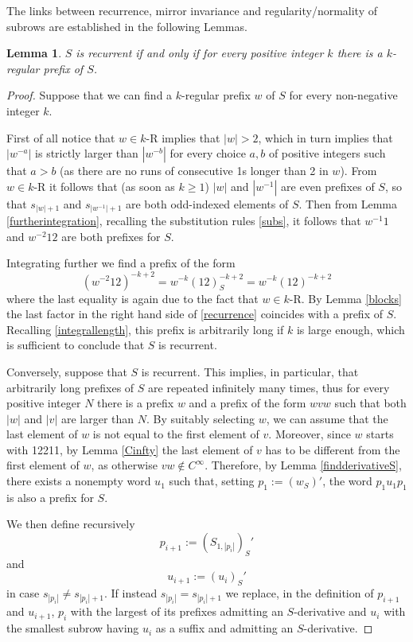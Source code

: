 \documentclass[10pt,a4paper]{article}
\newtheorem{lemma}{Lemma}
\begin{document}
The links between recurrence, mirror invariance and regularity/normality of subrows  are established in the following Lemmas. 


\begin{lemma}
$S$ is recurrent if and only if for every positive integer $k$ there is a $k$-regular prefix of $S$.
\label{recur}
\end{lemma}
\begin{proof}
Suppose that we can find a $k$-regular prefix $w$ of $S$ for every non-negative integer $k$. 


First of all notice that $w\in k$-R implies that $|w|>2$, which in turn implies that $|w^{-a}|$ is strictly larger than $|w^{-b}|$ for every choice $a,b$ of positive integers such that $a>b$ (as there are no runs of consecutive 1s longer than 2 in $w$). 
From $w\in k$-R it follows that (as soon as $k \ge 1$) $|w|$ and $|w^{-1}|$ are even prefixes of $S$, so that $s_{|w|+1}$ and $s_{|w^{-1}|+1}$ are both odd-indexed elements of $S$. Then from Lemma \ref{furtherintegration}, recalling the substitution rules \eqref{subs}, it follows that  $w^{-1}1$ and $w^{-2}12$ are both prefixes for $S$. 
 
Integrating further we find a prefix of the form
\begin{equation}
(w^{-2}12)^{-k+2}=w^{-k}(12)_S^{-k+2}=w^{-k}(12)^{-k+2}
\label{recurrence}
\end{equation}
where the last equality is again due to the fact that $w\in k$-R.
By Lemma \ref{blocks} the last factor in the right hand side of \eqref{recurrence} coincides with a prefix of $S$. Recalling \eqref{integrallength}, this prefix is arbitrarily long  if $k$ is large enough, which is sufficient to conclude that $S$ is recurrent. 

Conversely, suppose that $S$ is recurrent. This implies, in particular, that arbitrarily long prefixes of $S$ are repeated infinitely many times, thus for every positive integer $N$ there is a prefix $w$ and a prefix of the form $wvw$  such that both $|w|$ and $|v|$ are larger than $N$. By suitably selecting $w$, we can assume that the last element of $w$ is not equal to the first element of $v$. Moreover, since $w$ starts with 12211, by Lemma \ref{Cinfty} the last element of $v$ has to be different from the first element of $w$, as otherwise $vw\notin C^{\infty}$. Therefore, by Lemma \ref{findderivativeS}, there exists a nonempty word $u_1$ such that, setting $p_1:=(w_S)'$, the word $p_1 u_1 p_1$ is also a prefix for $S$. 

 We then define recursively $$p_{i+1}:=(S_{1,|p_i|})_S'$$ and $$u_{i+1}:=(u_i)_S'$$ in case $s_{|p_i|}\ne s_{|p_i|+1}$. If instead $s_{|p_i|}= s_{|p_i|+1}$ we replace, in the definition of $p_{i+1}$ and $u_{i+1}$,  $p_i$ with the largest of its prefixes admitting an $S$-derivative and $u_{i}$ with the smallest subrow having $u_{i}$ as a suffix and admitting an $S$-derivative. 


\end{proof}
\end{document}
